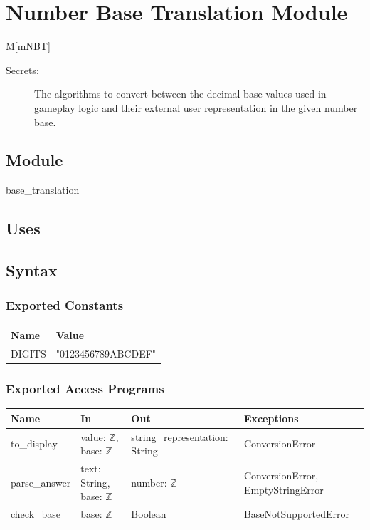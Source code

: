 \documentclass[12pt, titlepage]{article}
\newcommand{\mref}[1]{M\ref{#1}}
\begin{document}
\newpage

\section{Number Base Translation Module} \mref{mNBT} 


\begin{description}
\item[Secrets:] The algorithms to convert between the decimal-base values used in gameplay logic and their external user representation in the given number base.
\end{description}

\subsection{Module}

base\_translation

\subsection{Uses}


\subsection{Syntax}

\subsubsection{Exported Constants}

\begin{center}
\begin{tabular}{p{10cm} p{4cm}}
\hline
\textbf{Name} & \textbf{Value}\\
\hline
DIGITS & "0123456789ABCDEF" \\
\hline
\end{tabular}
\end{center}

\subsubsection{Exported Access Programs}

\begin{center}
\begin{tabular}{p{4cm} p{4cm} p{4cm} p{4cm}}
\hline
\textbf{Name} & \textbf{In} & \textbf{Out} & \textbf{Exceptions} \\
\hline
to\_display & value: $\mathbb{Z}$, base: $\mathbb{Z}$ & string\_representation: String & ConversionError \\
parse\_answer & text: String, base: $\mathbb{Z}$  & number: $\mathbb{Z}$ & ConversionError, EmptyStringError \\
check\_base & base: $\mathbb{Z}$ & Boolean & BaseNotSupportedError \\
\hline
\end{tabular}
\end{center}
\end{document}

